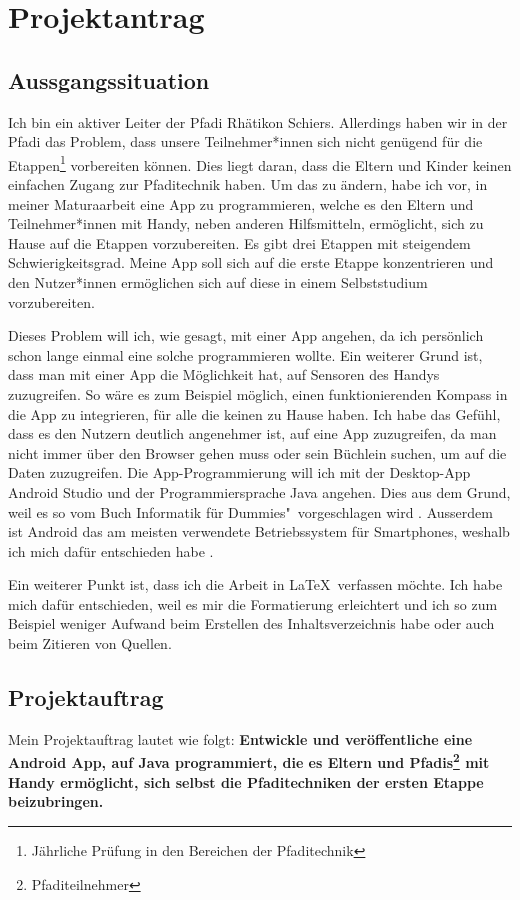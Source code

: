 \chapter{Projektantrag}
\section{Aussgangssituation}
Ich bin ein aktiver Leiter der Pfadi Rhätikon Schiers. Allerdings haben wir in der Pfadi das Problem, dass unsere Teilnehmer*innen sich nicht genügend für die Etappen\footnote{Jährliche Prüfung in den Bereichen der Pfaditechnik} vorbereiten können. Dies liegt daran, dass die Eltern und Kinder keinen einfachen Zugang zur Pfaditechnik haben. Um das zu ändern, habe ich vor, in meiner Maturaarbeit eine App zu programmieren, welche es den Eltern und Teilnehmer*innen mit Handy, neben anderen Hilfsmitteln, ermöglicht, sich zu Hause auf die Etappen vorzubereiten. Es gibt drei Etappen mit steigendem Schwierigkeitsgrad. Meine App soll sich auf die erste Etappe konzentrieren und den Nutzer*innen ermöglichen sich auf diese in einem Selbststudium vorzubereiten\cite{anforderungen}. \par
Dieses Problem will ich, wie gesagt, mit einer App angehen, da ich persönlich schon lange einmal eine solche programmieren wollte. Ein weiterer Grund ist, dass man mit einer App die Möglichkeit hat, auf Sensoren des Handys zuzugreifen. So wäre es zum Beispiel möglich, einen funktionierenden Kompass in die App zu integrieren, für alle die keinen zu Hause haben. Ich habe das Gefühl, dass es den Nutzern deutlich angenehmer ist, auf eine App zuzugreifen, da man nicht immer über den Browser gehen muss oder sein Büchlein suchen, um auf die Daten zuzugreifen. Die App-Programmierung will ich mit der Desktop-App Android Studio und der Programmiersprache Java angehen. Dies aus dem Grund, weil es so vom Buch \glqq Informatik für Dummies"\ vorgeschlagen wird \cite{dummies}. Ausserdem ist Android das am meisten verwendete Betriebssystem für Smartphones, weshalb ich mich dafür entschieden habe \cite{statistik_android}.
\par
Ein weiterer Punkt ist, dass ich die Arbeit in \LaTeX \ verfassen möchte. Ich habe mich dafür entschieden, weil es mir die Formatierung erleichtert und ich so zum Beispiel weniger Aufwand beim Erstellen des Inhaltsverzeichnis habe oder auch beim Zitieren von Quellen.

\section{Projektauftrag}
Mein Projektauftrag lautet wie folgt: \textbf{Entwickle und veröffentliche eine Android App, auf Java programmiert, die es Eltern und Pfadis\footnote{Pfaditeilnehmer} mit Handy ermöglicht, sich selbst die Pfaditechniken der ersten Etappe beizubringen.}

